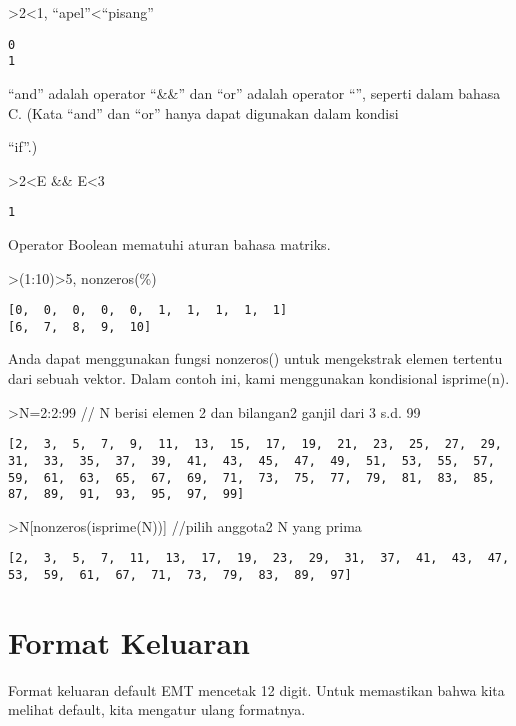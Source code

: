 \documentclass[
]{book}
\begin{document}
\textgreater2\textless1, ``apel''\textless{}``pisang''

\begin{verbatim}
0
1
\end{verbatim}

``and'' adalah operator ``\&\&'' dan ``or'' adalah operator ``\textbar\textbar{}'', seperti dalam bahasa C. (Kata ``and'' dan ``or'' hanya dapat digunakan dalam kondisi

``if''.)

\textgreater2\textless E \&\& E\textless3

\begin{verbatim}
1
\end{verbatim}

Operator Boolean mematuhi aturan bahasa matriks.

\textgreater(1:10)\textgreater5, nonzeros(\%)

\begin{verbatim}
[0,  0,  0,  0,  0,  1,  1,  1,  1,  1]
[6,  7,  8,  9,  10]
\end{verbatim}

Anda dapat menggunakan fungsi nonzeros() untuk mengekstrak elemen tertentu dari sebuah vektor. Dalam contoh ini, kami menggunakan kondisional isprime(n).

\textgreater N=2:2:99 // N berisi elemen 2 dan bilangan2 ganjil dari 3 s.d. 99

\begin{verbatim}
[2,  3,  5,  7,  9,  11,  13,  15,  17,  19,  21,  23,  25,  27,  29,
31,  33,  35,  37,  39,  41,  43,  45,  47,  49,  51,  53,  55,  57,
59,  61,  63,  65,  67,  69,  71,  73,  75,  77,  79,  81,  83,  85,
87,  89,  91,  93,  95,  97,  99]
\end{verbatim}

\textgreater N{[}nonzeros(isprime(N)){]} //pilih anggota2 N yang prima

\begin{verbatim}
[2,  3,  5,  7,  11,  13,  17,  19,  23,  29,  31,  37,  41,  43,  47,
53,  59,  61,  67,  71,  73,  79,  83,  89,  97]
\end{verbatim}

\section{Format Keluaran}\label{format-keluaran}

Format keluaran default EMT mencetak 12 digit. Untuk memastikan bahwa kita melihat default, kita mengatur ulang formatnya.
\end{document}

